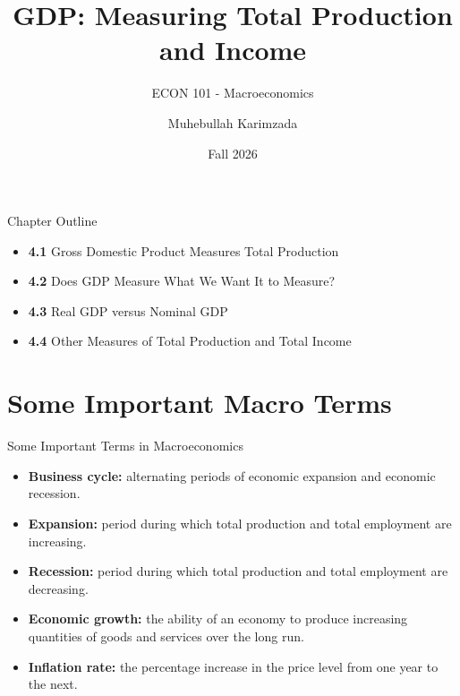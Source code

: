 \documentclass[aspectratio=169]{beamer}
\title{\textbf{GDP: Measuring Total Production and Income\vspace{.5cm}\\  }}
\subtitle{ {\large ECON 101 - Macroeconomics}}
\author{Muhebullah Karimzada}
\date{Fall 2026}
\begin{document}
\begin{frame}[plain]
  \titlepage
\end{frame}

\begin{frame}{Chapter Outline}
\transfade
\begin{itemize}
  \item \textbf{4.1} Gross Domestic Product Measures Total Production
  \item \textbf{4.2} Does GDP Measure What We Want It to Measure?
  \item \textbf{4.3} Real GDP versus Nominal GDP
  \item \textbf{4.4} Other Measures of Total Production and Total Income
\end{itemize}
\end{frame}

\section*{Some Important Macro Terms}

\begin{frame}{Some Important Terms in Macroeconomics}
\transfade
\begin{itemize}
  \item \textbf{Business cycle:} alternating periods of economic \alert{expansion} and economic \alert{recession}.
  \item \textbf{Expansion:} period during which total production and total employment are \alert{increasing}.
  \item \textbf{Recession:} period during which total production and total employment are \alert{decreasing}.
  \item \textbf{Economic growth:} the ability of an economy to produce \alert{increasing quantities} of goods and services over the long run.
  \item \textbf{Inflation rate:} the \alert{percentage increase} in the price level from one year to the next.
\end{itemize}
\end{frame}

\end{document}
